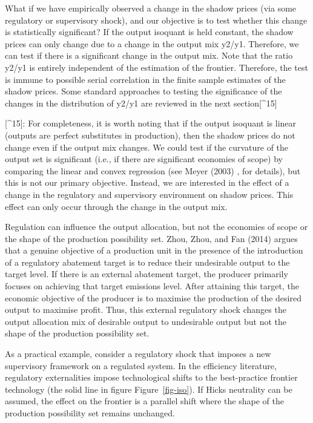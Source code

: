 \documentclass[
  letterpaper,
  DIV=11,
  numbers=noendperiod]{scrartcl}
\begin{document}
What if we have empirically observed a change in the shadow prices (via
some regulatory or supervisory shock), and our objective is to test
whether this change is statistically significant? If the output isoquant
is held constant, the shadow prices can only change due to a change in
the output mix y2/y1. Therefore, we can test if there is a significant
change in the output mix. Note that the ratio y2/y1 is entirely
independent of the estimation of the frontier. Therefore, the test is
immune to possible serial correlation in the finite sample estimates of
the shadow prices. Some standard approaches to testing the significance
of the changes in the distribution of y2/y1 are reviewed in the next
section{[}\^{}15{]}

{[}\^{}15{]}: For completeness, it is worth noting that if the output
isoquant is linear (outputs are perfect substitutes in production), then
the shadow prices do not change even if the output mix changes. We could
test if the curvature of the output set is significant (i.e., if there
are significant economies of scope) by comparing the linear and convex
regression (see Meyer (2003) , for details), but this is not our primary
objective. Instead, we are interested in the effect of a change in the
regulatory and supervisory environment on shadow prices. This effect can
only occur through the change in the output mix.

Regulation can influence the output allocation, but not the economies of
scope or the shape of the production possibility set. Zhou, Zhou, and
Fan (2014) argues that a genuine objective of a production unit in the
presence of the introduction of a regulatory abatement target is to
reduce their undesirable output to the target level. If there is an
external abatement target, the producer primarily focuses on achieving
that target emissions level. After attaining this target, the economic
objective of the producer is to maximise the production of the desired
output to maximise profit. Thus, this external regulatory shock changes
the output allocation mix of desirable output to undesirable output but
not the shape of the production possibility set.

As a practical example, consider a regulatory shock that imposes a new
supervisory framework on a regulated system. In the efficiency
literature, regulatory externalities impose technological shifts to the
best-practice frontier technology (the solid line in figure
Figure~\ref{fig-iso}). If Hicks neutrality can be assumed, the effect on
the frontier is a parallel shift where the shape of the production
possibility set remains unchanged.
\end{document}
